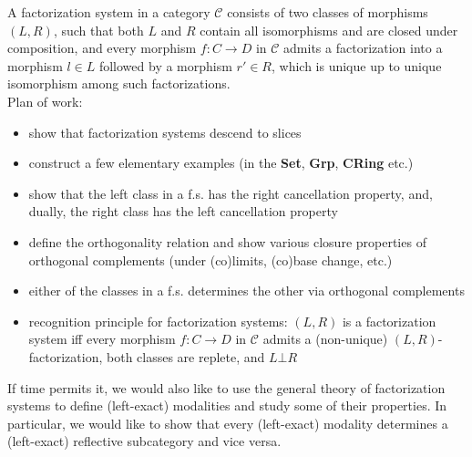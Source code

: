 %

A factorization system in a category $\mathcal{C}$ consists of two classes of morphisms $(L,R)$, such that both $L$ and $R$ contain all isomorphisms and are closed under composition, and every morphism $f: C \to D$ in $\mathcal{C}$ admits a factorization into a morphism $l\in L$ followed by a morphism $r'\in R$, which is unique up to unique isomorphism among such factorizations.\\
Plan of work:
\begin{itemize}
    \item show that factorization systems descend to slices
    \item construct a few elementary examples (in the \textbf{Set}, \textbf{Grp}, \textbf{CRing} etc.)
    \item show that the left class in a f.s. has the right cancellation property, and, dually, the right class has the left cancellation property
    \item define the orthogonality relation and show various closure properties of orthogonal complements (under (co)limits, (co)base change, etc.) 
    \item either of the classes in a f.s. determines the other via orthogonal complements
    \item recognition principle for factorization systems: $(L,R)$ is a factorization system iff every morphism $f: C \to D$ in $\mathcal{C}$ admits a (non-unique) $(L,R)$-factorization, both classes are replete, and $L\bot R$
\end{itemize}
If time permits it, we would also like to use the general theory of factorization systems to define (left-exact) modalities and study some of their properties. In particular, we would like to show that every (left-exact) modality determines a (left-exact) reflective subcategory and vice versa.